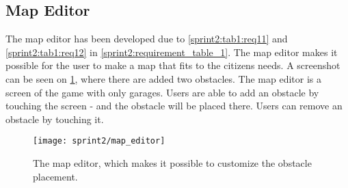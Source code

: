 \subsection{Map Editor}
The map editor has been developed due to \cref{sprint2:tab1:req11} and \cref{sprint2:tab1:req12} in \cref{sprint2:requirement_table_1}.
The map editor makes it possible for the user to make a map that fits to the citizens needs.
A screenshot can be seen on \cref{fig:sprint2:map_editor}, where there are added two obstacles.
The map editor is a screen of the game with only garages.
Users are able to add an obstacle by touching the screen - and the obstacle will be placed there.
Users can remove an obstacle by touching it.

\begin{figure}[h]
\texttt{[image: sprint2/map\_editor]}
\caption{The map editor, which makes it possible to customize the obstacle placement.}
\label{fig:sprint2:map_editor}
\end{figure}
 
